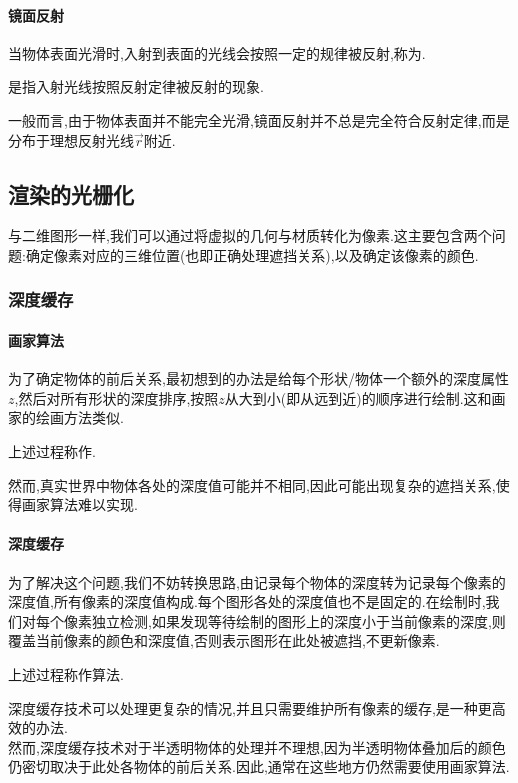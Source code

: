 \documentclass{ctexart}
\begin{document}
\paragraph{镜面反射}
当物体表面光滑时,入射到表面的光线会按照一定的规律被反射,称为.
\begin{definition}[镜面反射]
    是指入射光线按照反射定律被反射的现象.
\end{definition}
一般而言,由于物体表面并不能完全光滑,镜面反射并不总是完全符合反射定律,而是分布于理想反射光线$\vec{r}$附近.
\subsection{渲染的光栅化}
与二维图形一样,我们可以通过将虚拟的几何与材质转化为像素.这主要包含两个问题:确定像素对应的三维位置(也即正确处理遮挡关系),以及确定该像素的颜色.
\subsubsection{深度缓存}
\paragraph{画家算法}
为了确定物体的前后关系,最初想到的办法是给每个形状/物体一个额外的深度属性$z$,然后对所有形状的深度排序,按照$z$从大到小(即从远到近)的顺序进行绘制.这和画家的绘画方法类似.
\begin{definition}[画家算法]
    上述过程称作.
\end{definition}
然而,真实世界中物体各处的深度值可能并不相同,因此可能出现复杂的遮挡关系,使得画家算法难以实现.
\paragraph{深度缓存}
为了解决这个问题,我们不妨转换思路,由记录每个物体的深度转为记录每个像素的深度值,所有像素的深度值构成.每个图形各处的深度值也不是固定的.在绘制时,我们对每个像素独立检测,如果发现等待绘制的图形上的深度小于当前像素的深度,则覆盖当前像素的颜色和深度值,否则表示图形在此处被遮挡,不更新像素.
\begin{definition}
    上述过程称作算法.
\end{definition}
深度缓存技术可以处理更复杂的情况,并且只需要维护所有像素的缓存,是一种更高效的办法.\\
\indent 然而,深度缓存技术对于半透明物体的处理并不理想,因为半透明物体叠加后的颜色仍密切取决于此处各物体的前后关系.因此,通常在这些地方仍然需要使用画家算法.
\end{document}
